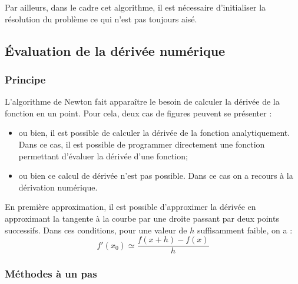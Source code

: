 \documentclass[10pt,fleqn]{article} %
\begin{document}
Par ailleurs, dans le cadre cet algorithme, il est nécessaire d'initialiser la résolution du problème ce qui n'est pas toujours aisé.

\subsection{Évaluation de la dérivée numérique}
\subsubsection{Principe}
L'algorithme de Newton fait apparaître le besoin de calculer la dérivée de la fonction en un point. Pour cela, deux cas de figures peuvent se présenter : 
\begin{itemize}
\item ou bien, il est possible de calculer la dérivée de la fonction analytiquement. Dans ce cas, il est possible de programmer directement une fonction permettant d'évaluer la dérivée d'une fonction;
\item ou bien ce calcul de dérivée n'est pas possible. Dans ce cas on a recours à la dérivation numérique.
\end{itemize}

\begin{resultat}
En première approximation, il est possible d'approximer la dérivée en approximant la tangente à la courbe par une droite passant par deux points successifs. Dans ces conditions, pour une valeur de $h$ suffisamment faible, on a : 
$$
f'(x_0)\simeq \dfrac{f(x+h)-f(x)}{h}	
$$
\end{resultat}


%

\subsubsection{Méthodes à un pas}
\end{document}
